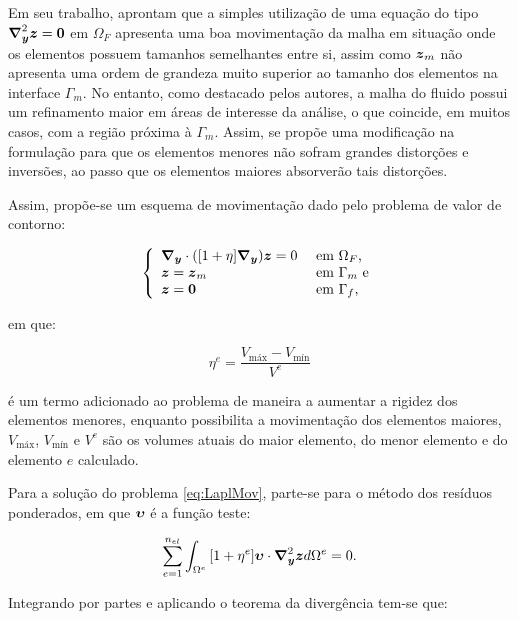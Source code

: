 Em seu trabalho,  aprontam que a simples utilização de uma equação do tipo $\boldsymbol{\nabla}^2_{\boldsymbol{y}}\boldsymbol{z}=\boldsymbol{0}$ em $\Omega_F$ apresenta uma boa movimentação da malha em situação onde os elementos possuem tamanhos semelhantes entre si, assim como $\boldsymbol{z}_m$ não apresenta uma ordem de grandeza muito superior ao tamanho dos elementos na interface $\Gamma_m$. No entanto, como destacado pelos autores, a malha do fluido possui um refinamento maior em áreas de interesse da análise, o que coincide, em muitos casos, com a região próxima à $\Gamma_m$. Assim, se propõe uma modificação na formulação para que os elementos menores não sofram grandes distorções e inversões, ao passo que os elementos maiores absorverão tais distorções.

Assim, propõe-se um esquema de movimentação dado pelo problema de valor de contorno:

\begin{equation}
    \left\{
    \begin{array}{ll}
        \boldsymbol{\nabla_y}\cdot([1+\eta]\boldsymbol{\nabla_y})\boldsymbol{z}=0 & \text{ em }\Omega_F\text{,}  \\
        \boldsymbol{z}=\boldsymbol{z}_m               & \text{ em }\Gamma_m\text{ e} \\
        \boldsymbol{z}=\boldsymbol{0}                 & \text{ em }\Gamma_f\text{,}
    \end{array}
    \right.\label{eq:LaplMov}
\end{equation}

\noindent em que:

\begin{equation}
    \eta^e=\frac{V_\mathrm{máx}-V_\mathrm{mín}}{V^e}
    \label{eq:movStiff}
\end{equation}

\noindent é um termo adicionado ao problema de maneira a aumentar a rigidez dos elementos menores, enquanto possibilita a movimentação dos elementos maiores, $V_\mathrm{máx}$, $V_\mathrm{mín}$ e $V^e$ são os volumes atuais do maior elemento, do menor elemento e do elemento $e$ calculado.

Para a solução do problema \eqref{eq:LaplMov}, parte-se para o método dos resíduos ponderados, em que $\boldsymbol{\upsilon}$ é a função teste:

\begin{equation}
    \sum_{e=1}^{n_{el}}{\int_{\Omega^e}{[1+\eta^e]\boldsymbol{\upsilon}\cdot\boldsymbol{\nabla}^2_{\boldsymbol{y}}\boldsymbol{z} d\Omega^e}}=0\text{.}
\end{equation}

Integrando por partes e aplicando o teorema da divergência tem-se que:

